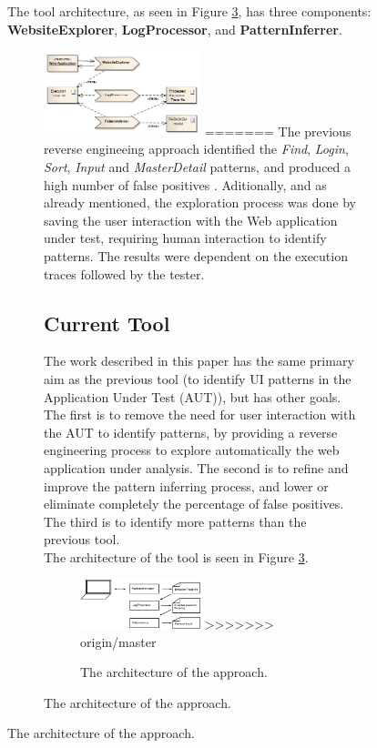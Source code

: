 \documentclass[conference]{IEEEtran}
\begin{document}
\begin{enumerate}
\begin{figure}[!htb]
\begin{itemize}
The tool architecture, as seen in Figure \ref{fig:retool}, has three components: \textbf{WebsiteExplorer}, \textbf{LogProcessor}, and \textbf{PatternInferrer}.

\begin{figure}[!htb]
\centering
\includegraphics[width=0.5\textwidth]{approach}
=======
The previous reverse engineeing approach identified the \textit{Find}, \textit{Login}, \textit{Sort}, \textit{Input} and \textit{MasterDetail} patterns, and produced a high number of false positives \cite{nabuco2013inferring}. Aditionally, and as already mentioned, the exploration process was done by saving the user interaction with the Web application under test, requiring human interaction to identify patterns. The results were dependent on the execution traces followed by the tester. \\

\subsection{Current Tool}

The work described in this paper has the same primary aim as the previous tool (to identify UI patterns in the Application Under Test (AUT)), but has other goals. The first is to remove the need for user interaction with the AUT to identify patterns, by providing a reverse engineering process to explore automatically the web application under analysis. The second is to refine and improve the pattern inferring process, and lower or eliminate completely the percentage of false positives. The third is to identify more patterns than the previous tool.\\

The architecture of the tool is seen in Figure \ref{fig:retool}.
\begin{figure}[!htb]
\centering
\includegraphics[width=0.5\textwidth]{retool}
>>>>>>> origin/master
\caption{The architecture of the approach.}
\label{fig:retool}
\end{figure}


\end{figure}
\end{itemize}
\end{figure}
\end{enumerate}
\end{document}
